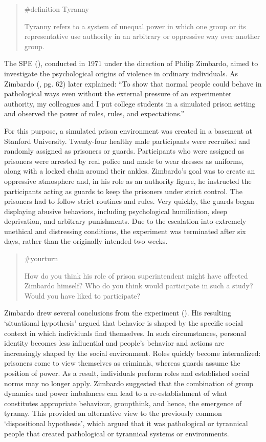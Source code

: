 \documentclass[
  letterpaper,
]{book}
\begin{document}
\begin{quote}
\label{def-tyranny}{\#definition} Tyranny

Tyranny refers to a system of unequal power in which one group or its
representative use authority in an arbitrary or oppressive way over
another group.
\end{quote}

The SPE (),
conducted in 1971 under the direction of Philip Zimbardo, aimed to
investigate the psychological origins of violence in ordinary
individuals. As Zimbardo (, pg.
62) later explained: ``To show that normal people could behave in
pathological ways even without the external pressure of an experimenter
authority, my colleagues and I put college students in a simulated
prison setting and observed the power of roles, rules, and
expectations.''

For this purpose, a simulated prison environment was created in a
basement at Stanford University. Twenty-four healthy male participants
were recruited and randomly assigned as prisoners or guards.
Participants who were assigned as prisoners were arrested by real police
and made to wear dresses as uniforms, along with a locked chain around
their ankles. Zimbardo's goal was to create an oppressive atmosphere
and, in his role as an authority figure, he instructed the participants
acting as guards to keep the prisoners under strict control. The
prisoners had to follow strict routines and rules. Very quickly, the
guards began displaying abusive behaviors, including psychological
humiliation, sleep deprivation, and arbitrary punishments. Due to the
escalation into extremely unethical and distressing conditions, the
experiment was terminated after six days, rather than the originally
intended two weeks.

\begin{quote}
{\#yourturn}

How do you think his role of prison superintendent might have affected
Zimbardo himself? Who do you think would participate in such a study?
Would you have liked to participate?
\end{quote}

Zimbardo drew several conclusions from the experiment
(). His resulting
`situational hypothesis' argued that behavior is shaped by the specific
social context in which individuals find themselves. In such
circumstances, personal identity becomes less influential and people's
behavior and actions are increasingly shaped by the social environment.
Roles quickly become internalized: prisoners come to view themselves as
criminals, whereas guards assume the position of power. As a result,
individuals perform roles and established social norms may no longer
apply. Zimbardo suggested that the combination of group dynamics and
power imbalances can lead to a re-establishment of what constitutes
appropriate behaviour, groupthink, and hence, the emergence of tyranny.
This provided an alternative view to the previously common
`dispositional hypothesis', which argued that it was pathological or
tyrannical people that created pathological or tyrannical systems or
environments.
\end{document}
